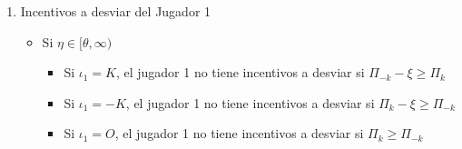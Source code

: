 {\begin{enumerate}
\begin{enumerate}
\begin{enumerate}
\begin{itemize}
        \item Si el jugador 2 recibe $E_{-k}$ como señal
            \begin{eqnarray*}
                U_{2}^{e}(I)&=&P(K|E_{-k})V(K,E_{-k},I)\ +\ P(-K|E_{-k})V(-K,E_{-k},I)\\ 
                            &+&P(O|E_{-k})V(O,E_{-k},I)\\
                            &=&0.98*(-\theta)\ +\ 0*0\ + \ 0.02*(-\theta)\\
                            &=&-\theta
            \end{eqnarray*}
            \begin{eqnarray*}
                U_{2}^{e}(NI)&=&P(K|E_{-k})V(K,E_{-k},NI)\ +\ P(-K|E_{-k})V(-K,E_{-k},NI)\\
                             &+&P(O|E_{-k})V(O,E_{-k},NI)\\
                             &=&0.98*(-\eta)\ +\ 0*(-\eta)\ + \ 0.02*(-\eta)\\
                             &=&-\eta
            \end{eqnarray*}
            La mejor respuesta del jugador 2 si recibe un señal $E_{-k}$ es:
            \begin{equation*}
                \gamma_2(E_{-k})=
                \begin{cases}
                    I \text{ si } \eta \geq \theta \\
                    NI \text{ si } \eta < \theta \\
                \end{cases}    
            \end{equation*}
        \end{itemize}
    \end{enumerate}
    \item Incentivos a desviar del Jugador 1
    \begin{itemize}
        \item Si $\eta \in [\theta,\infty) $
            \begin{itemize}
                \item Si $ \iota_1=K  $, el jugador 1 no tiene incentivos a desviar si $ \Pi_{-k} - \xi \geq \Pi_k $
                \item Si $ \iota_1=-K $, el jugador 1 no tiene incentivos a desviar si $ \Pi_k - \xi \geq \Pi_{-k} $
                \item Si $ \iota_1=O  $, el jugador 1 no tiene incentivos a desviar si $ \Pi_k \geq \Pi_{-k} $

\end{itemize}
\end{itemize}
\end{enumerate}
\end{enumerate}}
